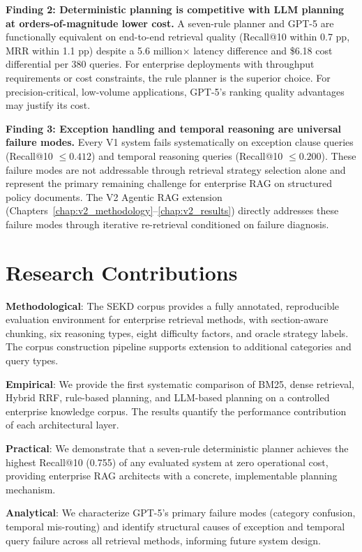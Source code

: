 \textbf{Finding 2: Deterministic planning is competitive with LLM planning at orders-of-magnitude lower cost.} A seven-rule planner and GPT-5 are functionally equivalent on end-to-end retrieval quality (Recall@10 within 0.7 pp, MRR within 1.1 pp) despite a 5.6 million$\times$ latency difference and \$6.18 cost differential per 380 queries. For enterprise deployments with throughput requirements or cost constraints, the rule planner is the superior choice. For precision-critical, low-volume applications, GPT-5's ranking quality advantages may justify its cost.

\textbf{Finding 3: Exception handling and temporal reasoning are universal failure modes.} Every V1 system fails systematically on exception clause queries (Recall@10 $\leq{0.412}$) and temporal reasoning queries (Recall@10 $\leq{0.200}$). These failure modes are not addressable through retrieval strategy selection alone and represent the primary remaining challenge for enterprise RAG on structured policy documents. The V2 Agentic RAG extension (Chapters~\ref{chap:v2_methodology}--\ref{chap:v2_results}) directly addresses these failure modes through iterative re-retrieval conditioned on failure diagnosis.

\section{Research Contributions}
\label{sec:conc_contributions}

\textbf{Methodological}: The SEKD corpus provides a fully annotated, reproducible evaluation environment for enterprise retrieval methods, with section-aware chunking, six reasoning types, eight difficulty factors, and oracle strategy labels. The corpus construction pipeline supports extension to additional categories and query types.

\textbf{Empirical}: We provide the first systematic comparison of BM25, dense retrieval, Hybrid RRF, rule-based planning, and LLM-based planning on a controlled enterprise knowledge corpus. The results quantify the performance contribution of each architectural layer.

\textbf{Practical}: We demonstrate that a seven-rule deterministic planner achieves the highest Recall@10 (0.755) of any evaluated system at zero operational cost, providing enterprise RAG architects with a concrete, implementable planning mechanism.

\textbf{Analytical}: We characterize GPT-5's primary failure modes (category confusion, temporal mis-routing) and identify structural causes of exception and temporal query failure across all retrieval methods, informing future system design.

